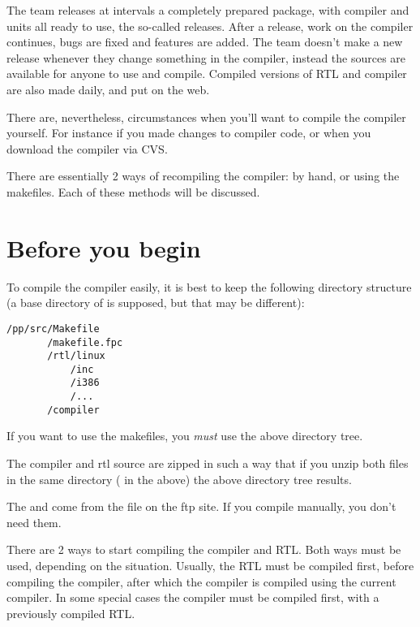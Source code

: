 \documentclass{report}
\begin{document}
The \fpc team releases at intervals a completely prepared package, with 
compiler and units all ready to use, the so-called releases.  After a
release, work on the compiler continues, bugs are fixed and features are
added. The \fpc team doesn't make a new release whenever they change
something in the compiler, instead the sources are available for anyone to
use and compile. Compiled versions of RTL and compiler are also made daily,
and put on the web.

There are, nevertheless, circumstances when you'll want to compile the
compiler yourself. For instance if you made changes to compiler code,
or when you download the compiler via CVS. 

There are essentially 2 ways of recompiling the compiler: by hand, or using
the makefiles. Each of these methods will be discussed.

\section{Before you begin}

To compile the compiler easily, it is best to keep the following directory
structure (a base directory of  is supposed, but that may be
different):
\begin{verbatim}
/pp/src/Makefile
       /makefile.fpc
       /rtl/linux
           /inc
           /i386
           /...
       /compiler
\end{verbatim}
If you want to use the makefiles, you {\em must} use the above directory
tree.

The compiler and rtl source are zipped in such a way that if you unzip both
files in the same directory ( in the above) the above
directory tree results.

The  and  come from the 
file on the ftp site. If you compile manually, you don't need them.

There are 2 ways to start compiling the compiler and RTL. Both ways must be
used, depending on the situation. Usually, the RTL must be compiled first,
before compiling the compiler, after which the compiler is compiled using
the current compiler. In some special cases the compiler must be compiled
first, with a previously compiled RTL.
\end{document}
